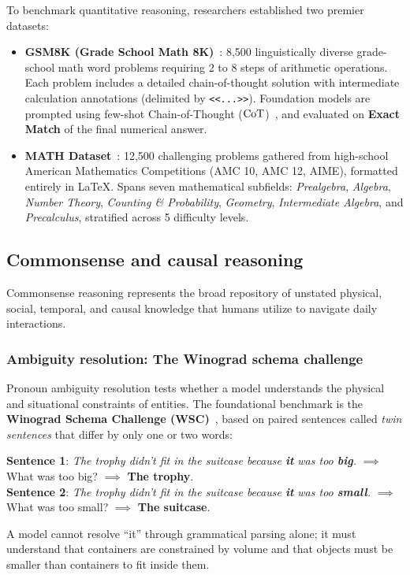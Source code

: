 \documentclass[../../main.tex]{subfiles}
\begin{document}
To benchmark quantitative reasoning, researchers established two premier datasets:
\begin{itemize}
    \item \textbf{GSM8K (Grade School Math 8K)}~\cite{cobbe2021gsm8k}: 8,500 linguistically diverse grade-school math word problems requiring 2 to 8 steps of arithmetic operations. Each problem includes a detailed chain-of-thought solution with intermediate calculation annotations (delimited by \texttt{<<...>>}). Foundation models are prompted using few-shot Chain-of-Thought ($\mathrm{CoT}$)~\cite{wei2022chain}, and evaluated on \textbf{Exact Match} of the final numerical answer.
    \item \textbf{MATH Dataset}~\cite{hendrycks2021math}: 12,500 challenging problems gathered from high-school American Mathematics Competitions (AMC 10, AMC 12, AIME), formatted entirely in \LaTeX. Spans seven mathematical subfields: \textit{Prealgebra}, \textit{Algebra}, \textit{Number Theory}, \textit{Counting \& Probability}, \textit{Geometry}, \textit{Intermediate Algebra}, and \textit{Precalculus}, stratified across 5 difficulty levels.
\end{itemize}

\subsection{Commonsense and causal reasoning}
\label{subsec:commonsense_causal_reasoning}

Commonsense reasoning represents the broad repository of unstated physical, social, temporal, and causal knowledge that humans utilize to navigate daily interactions.

\subsubsection{Ambiguity resolution: The Winograd schema challenge}
Pronoun ambiguity resolution tests whether a model understands the physical and situational constraints of entities. The foundational benchmark is the \textbf{Winograd Schema Challenge (WSC)}~\cite{levesque2012winograd}, based on paired sentences called \textit{twin sentences} that differ by only one or two words:
\begin{center}
\begin{minipage}{0.92\textwidth}
\begin{tcolorbox}[colback=cardBg,colframe=cardLine,arc=2pt,boxrule=0.5pt]
\small\sffamily
\textbf{Sentence 1}: \textit{The trophy didn't fit in the suitcase because \textbf{it} was too \textbf{big}.} $\implies$ What was too big? $\implies$ \textbf{The trophy}. \\
\textbf{Sentence 2}: \textit{The trophy didn't fit in the suitcase because \textbf{it} was too \textbf{small}.} $\implies$ What was too small? $\implies$ \textbf{The suitcase}.
\end{tcolorbox}
\end{minipage}
\end{center}
A model cannot resolve ``it'' through grammatical parsing alone; it must understand that containers are constrained by volume and that objects must be smaller than containers to fit inside them.
\end{document}
